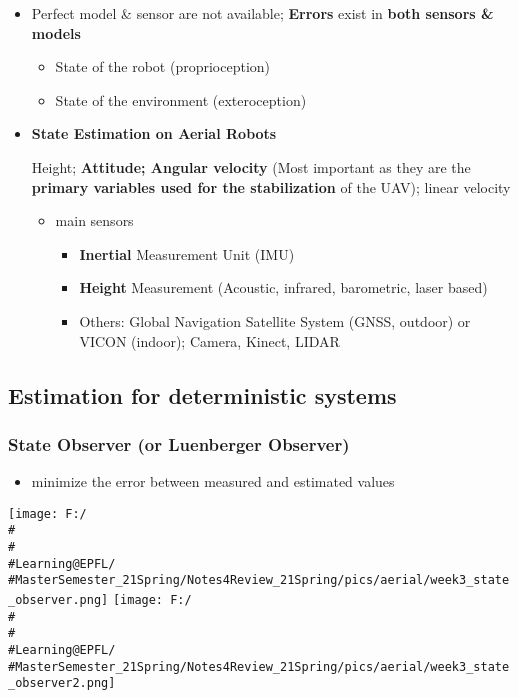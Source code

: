 \documentclass[]{article}
\begin{document}
\begin{itemize}
\item
  Perfect model \& sensor are not available; \textbf{Errors} exist in
  \textbf{both sensors \& models}

  \begin{itemize}
  \item
    State of the robot (proprioception)
  \item
    State of the environment (exteroception)
  \end{itemize}
\item
  \textbf{State Estimation on Aerial Robots}

  Height; \textbf{Attitude; Angular velocity} (Most important as they
  are the \textbf{primary variables used for the stabilization} of the
  UAV); linear velocity

  \begin{itemize}
  \item
    main sensors

    \begin{itemize}
    \item
      \textbf{Inertial} Measurement Unit (IMU)
    \item
      \textbf{Height} Measurement (Acoustic, infrared, barometric, laser
      based)
    \item
      Others: Global Navigation Satellite System (GNSS, outdoor) or
      VICON (indoor); Camera, Kinect, LIDAR
    \end{itemize}
  \end{itemize}
\end{itemize}

\subsection{Estimation for deterministic systems}\label{header-n860}

\subsubsection{State Observer (or Luenberger
Observer)}\label{header-n861}

\begin{itemize}
\item
  minimize the error between measured and estimated values
\end{itemize}

\texttt{[image: F:/\\\#\\\#\\\#Learning@EPFL/\\\#MasterSemester\_21Spring/Notes4Review\_21Spring/pics/aerial/week3\_state\_observer.png]}
\texttt{[image: F:/\\\#\\\#\\\#Learning@EPFL/\\\#MasterSemester\_21Spring/Notes4Review\_21Spring/pics/aerial/week3\_state\_observer2.png]}
\end{document}
